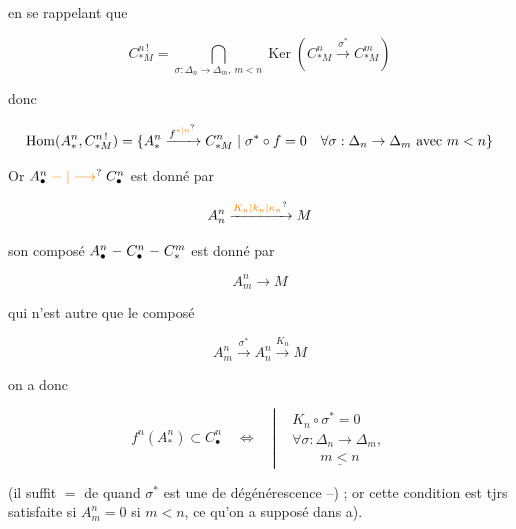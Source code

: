 en se rappelant que

\[
C^{n\,!}_{*M}=\bigcap_{\sigma:\Delta_n\to\Delta_m,\ m<n}\operatorname{Ker}(C^n_{*M}\xrightarrow{\sigma^*} C^m_{*M})
\]


donc

\[
\operatorname{Hom}(A^n_*,C^{n\,!}_{*M})=
\{A^n_*\xrightarrow{f^{\unsure{*|n}}}C^n_{*M}\mid \sigma^*\circ f=0\quad\forall\sigma:\Delta_n\to\Delta_m\text{ avec }m<n\}
\]


Or  $A^n_\bullet\mathrel{\unsure{\relbar|\longrightarrow}}C^n_\bullet$ est donné par

\[
A^n_n\xrightarrow{\unsure{K_n|k_n|\kappa_n}}M
\]

son composé $A^n_\bullet\relbar C^n_\bullet\relbar C^m_*$ est donné par 

\[
A^n_m\longrightarrow M
\]

qui n'est autre que le composé

\[
A^n_m\xrightarrow{\sigma^*}A^n_n\xrightarrow{K_n}M
\]

 on a donc

\[
f^n(A^n_*)\subset C^n_\bullet\quad\Longleftrightarrow\quad
\left|\begin{aligned}
&K_n\circ\sigma^*=0\\
&\forall\sigma:\Delta_n\longrightarrow\Delta_m,\\[-2pt]
&\hspace{2em}\underline{m<n}
\end{aligned}\right.
\]

(il suffit $=$ de  quand $\sigma^*$ est une  de dégénérescence --) ; or cette condition est tjrs satisfaite si $A_m^n=0$ si $m<n$, ce qu'on a supposé dans a).

